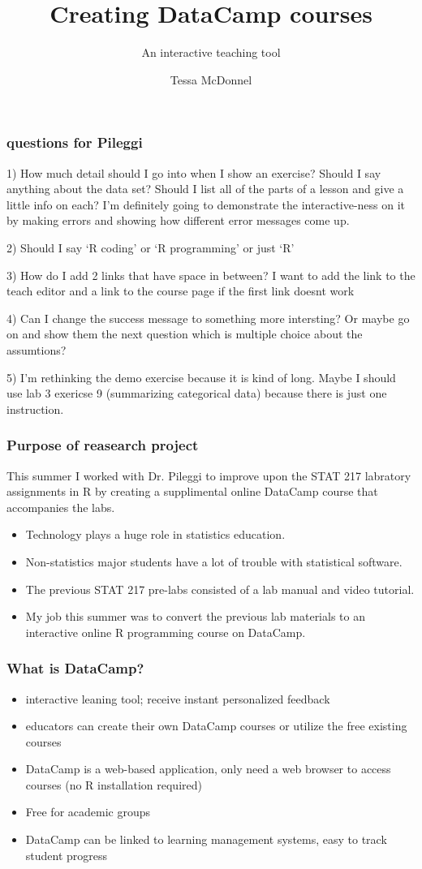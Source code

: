 \documentclass{beamer}
\title{Creating DataCamp courses}
\subtitle{An interactive teaching tool}
\author{Tessa McDonnel}
\institute{Cal Poly San Luis Obispo}
\date{}
\begin{document}
 
\frame{\titlepage}

\begin{frame}
\frametitle{questions for Pileggi}


1) How much detail should I go into when I show an exercise? Should I say anything about the data set? Should I list all of the parts of a lesson and give a little info on each? I'm definitely going to demonstrate the interactive-ness on it by making errors and showing how different error messages come up.

2) Should I say `R coding' or `R programming' or just `R'

3) How do I add 2 links that have space in between? I want to add the link to the teach editor and a link to the course page if the first link doesnt work

4) Can I change the success message to something more intersting? Or maybe go on and show them the next question which is multiple choice about the assumtions?

5) I'm rethinking the demo exercise because it is kind of long. Maybe I should use lab 3 exericse 9 (summarizing categorical data) because there is just one instruction.
\end{frame}

\begin{frame}
\frametitle{Purpose of reasearch project}

This summer I worked with Dr. Pileggi to improve upon the STAT 217 labratory assignments in R by creating
a supplimental online DataCamp course that accompanies the labs. 

\begin{itemize}
 \item<1-> Technology plays a huge role in statistics education.
 \item<2-> Non-statistics major students have a lot of trouble with statistical software.
 \item<3-> The previous STAT 217 pre-labs consisted of a lab manual and video tutorial.
 \item<4-> My job this summer was to convert the previous lab materials to an interactive online R programming course on DataCamp.
\end{itemize}

\end{frame}
 
\begin{frame}
\frametitle{What is DataCamp?}
\begin{itemize}
 \item<1-> interactive leaning tool; receive instant personalized feedback
 \item<2-> educators can create their own DataCamp courses or utilize the free existing courses 
 \item<3-> DataCamp is a web-based application, only need a web browser to access courses (no R installation required)
 \item<4-> Free for academic groups 
 \item<5-> DataCamp can be linked to learning management systems, easy to track student progress
\end{itemize}
\end{frame}
\end{document}
